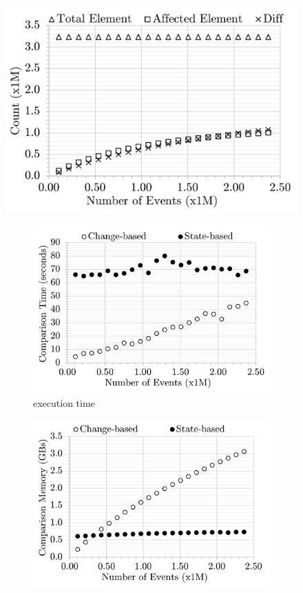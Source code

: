 \documentclass{jot}
\begin{document}
\begin{figure}
    \vspace{-35pt}
    \includegraphics[width=\linewidth]{mixed-count-events}
    \caption{total elements, affected elements, and diffs}
    \label{fig:modification_course}
    \begin{subfigure}[t]{\linewidth}
        \includegraphics[width=\linewidth]{mixed-time-events}
        \caption{execution time}
        \label{fig:time_diffs}
    \end{subfigure}
    \begin{subfigure}[t]{\linewidth}
        \includegraphics[width=\linewidth]{mixed-memory-events}

\end{subfigure}
\end{figure}
\end{document}
